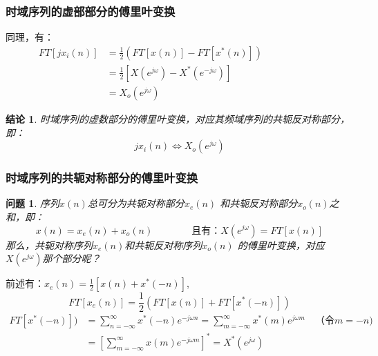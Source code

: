 \documentclass[notheorems,compress,mathserif,table]{beamer}
\newtheorem{wenti}{问题}
\newtheorem{jielun}{结论}
\begin{document}
\begin{frame}[shrink]\frametitle{ 时域序列的虚部部分的傅里叶变换}%
同理，有：
\begin{equation*}
\begin{split}
FT[jx_{i}(n)] &= \frac{1}{2}(FT[x(n)] - FT[x^{*}(n)]) \qquad\qquad\qquad\\
&= \frac{1}{2}\left[X(e^{j\omega}) - X^{*}(e^{-j\omega})\right] \\
&= X_{o}(e^{j\omega})
\end{split}
\end{equation*}

\begin{jielun}
时域序列的虚数部分的傅里叶变换，对应其频域序列的共轭反对称部分，即：
$$jx_i(n) \Longleftrightarrow X_{o}(e^{j\omega})$$
\end{jielun}



\end{frame}


\begin{frame}[shrink]\frametitle{时域序列的共轭对称部分的傅里叶变换}%

\begin{wenti}
序列$x(n)$总可分为共轭对称部分$x_{e}(n)$ 和共轭反对称部分$x_{o}(n)$之和，即：
$$x(n) = x_{e}(n)+x_{o}(n) \qquad\qquad     \mbox{且有：} X(e^{j\omega}) = FT[x(n)] $$
那么，共轭对称序列$x_{e}(n)$和共轭反对称序列$x_{o}(n)$ 的傅里叶变换，对应$X(e^{j\omega})$那个部分呢？
\end{wenti}

\par 前述有：\quad $ x_{e}(n) = \frac{1}{2}[x(n) + x^{*}(-n)]$,
$$FT[x_{e}(n)] = \frac{1}{2}(FT[x(n)] + FT[x^{*}(-n)])$$
\begin{equation*}
\begin{split}
FT[x^{*}(-n)])&= \sum_{n=-\infty}^{\infty}x^{*}(-n)e^{-j\omega n}
= \sum_{m=-\infty}^{\infty}x^{*}(m)e^{j\omega m}\quad\mbox{（令$m=-n$})\\
&= \left[\sum_{m=-\infty}^{\infty}x(m)e^{-j\omega m}\right]^{*}
= X^{*}(e^{j\omega})
\end{split}
\end{equation*}
\end{frame}
\end{document}
